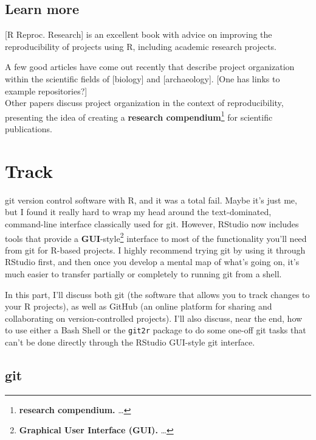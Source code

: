 \documentclass[]{tufte-book}
\begin{document}
\hypertarget{learn-more}{%
\section{Learn more}\label{learn-more}}

{[}R Reproc. Research{]} is an excellent book with advice on improving the reproducibility of
projects using R, including academic research projects.

A few good articles have come out recently that describe project organization within
the scientific fields of {[}biology{]} and {[}archaeology{]}. {[}One has links to example repositories?{]}\\
Other papers discuss project organization in the context of reproducibility, presenting
the idea of creating a \textbf{research compendium}\footnote{\textbf{research compendium.} \ldots{}} for scientific
publications.

\hypertarget{track}{%
\chapter{Track}\label{track}}

 git version control software with R, and
it was a total fail. Maybe it's just me, but I found it really hard to wrap my head around
the text-dominated, command-line interface classically used for git. However, RStudio now
includes tools that provide a \textbf{GUI}-style\footnote{\textbf{Graphical User Interface (GUI).} \ldots{}}
interface to most of the functionality you'll need from git for R-based projects. I highly
recommend trying git by using it through RStudio first, and then once you develop a mental
map of what's going on, it's much easier to transfer partially or completely to running git
from a shell.

In this part, I'll discuss both git (the software that allows you to track changes to your
R projects), as well as GitHub (an online platform for sharing and collaborating on
version-controlled projects). I'll also discuss, near the end, how to use either a Bash
Shell or the \texttt{git2r} package to do some one-off git tasks that can't be done directly through
the RStudio GUI-style git interface.

\hypertarget{git}{%
\section{git}\label{git}}
\end{document}
